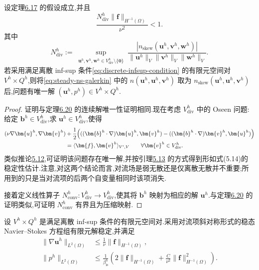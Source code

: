 \begin{theorem}\label{thm:steady-ns-galerkin-small-data}
设定理\hyperref[thm:steady-ns-existence]{6.17} 的假设成立,并且
\begin{equation}\label{eq:steady-ns-discrete-small-data}
  \frac{N_{\mathrm{div}}^h\|\bm{f}\|_{H^{-1}(\Omega)}}{\nu^2}<1.
\end{equation}
其中
\begin{equation}\label{eq:steady-ns-discrete-convection-norm}
  N_{\mathrm{div}}^h
   :=\sup_{\substack{\bm{u}^h,\bm{v}^h,\bm{w}^h
                       \in V_{\mathrm{div}}^h\setminus\{\bm{0}\}}}
     \frac{|n_{\mathrm{skew}}(\bm{u}^h,\bm{v}^h,\bm{w}^h)|}
          {\|\bm{u}^h\|_V\|\bm{v}^h\|_V\|\bm{w}^h\|_V}.
\end{equation}
若采用满足离散 inf-sup 条件\cref{eq:discrete-infsup-condition} 的有限元空间对 $V^h\times Q^h$,则将\cref{eq:steady-ns-galerkin} 中的 $n(\bm{u}^h,\bm{u}^h,\bm{v}^h)$ 取为 $n_{\mathrm{skew}}(\bm{u}^h,\bm{u}^h,\bm{v}^h)$ 后,问题有唯一解 $(\bm{u}^h,p^h)\in V^h\times Q^h$.
\end{theorem}

\begin{proof}
证明与定理\hyperref[thm:steady-ns-small-data]{6.20} 的连续解唯一性证明相同.现在考虑 $V_{\mathrm{div}}^h$ 中的 Oseen 问题:给定 $\bm{b}^h\in V_{\mathrm{div}}^h$,求 $\bm{u}^h\in V_{\mathrm{div}}^h$,使得
\[
\begin{aligned}
  (\nu\nabla\bm{u}^h,\nabla\bm{v}^h)
   &+\frac12\Bigl(
       ((\bm{b}^h\cdot\nabla)\bm{u}^h,\bm{v}^h)
       -((\bm{b}^h\cdot\nabla)\bm{v}^h,\bm{u}^h)\Bigr)\\
   &=\langle\bm{f},\bm{v}^h\rangle_{V',V}
      \qquad\forall\bm{v}^h\in V_{\mathrm{div}}^h.
\end{aligned}
\]
类似推论\hyperref[cor:oseen-fem-unique-solvability]{5.12},可证明该问题存在唯一解,并按引理\hyperref[lem:oseen-fem-stability]{5.13} 的方式得到形如式(5.14)的稳定性估计.注意,对这两个结论而言,对流场是弱无散还是仅离散无散并不重要;所用到的只是当对流项的后两个自变量相同时该项消失.

接着定义线性算子 $N_{\mathrm{conv}}^h:V_{\mathrm{div}}^h\to V_{\mathrm{div}}^h$,使其将 $\bm{b}^h$ 映射为相应的解 $\bm{u}^h$.与定理\hyperref[thm:steady-ns-small-data]{6.20} 的证明类似,可证明 $N_{\mathrm{conv}}^h$ 有界且为压缩映射.
\end{proof}

\begin{lemma}[有限元解的稳定性]\label{lem:steady-ns-galerkin-stability}
设 $V^h\times Q^h$ 是满足离散 inf-sup 条件的有限元空间对.采用对流项斜对称形式的稳态 Navier--Stokes 方程组有限元解稳定,并满足
\begin{align}
  \|\nabla\bm{u}^h\|_{L^2(\Omega)}
    &\le\frac1\nu\|\bm{f}\|_{H^{-1}(\Omega)},\label{eq:steady-ns-galerkin-stability-velocity}\\
  \|p^h\|_{L^2(\Omega)}
    &\le\frac1{\beta_{\mathrm{is}}^h}
       \left(2\|\bm{f}\|_{H^{-1}(\Omega)}
             +\frac{C}{\nu^2}\|\bm{f}\|_{H^{-1}(\Omega)}^2\right).
       \label{eq:steady-ns-galerkin-stability-pressure}
\end{align}
\end{lemma}

